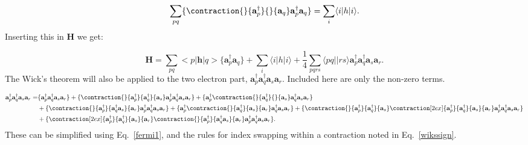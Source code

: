\documentclass[graybox,sectrefs,envcountresetchap,open=right]{svmonodo}
\begin{document}
\begin{equation}
\sum_{pq}
\{\contraction{}{\mathbf{a}^{\dagger}_p}{}{\mathbf{a}_q}
\mathbf{a}^{\dagger}_p \mathbf{a}_q \} = \sum_i \langle i|h|i \rangle .
\end{equation} 
Inserting this in $\mathbf{H}$ we get:

\begin{equation}
\mathbf{H} = \sum_{pq} <p|\mathbf{h}|q> 
\{\mathbf{a}^{\dagger}_p \mathbf{a}_q \}
+ \sum_i \langle i|h|i \rangle
 + 
\frac{1}{4} \sum_{pqrs} \langle pq||rs \rangle \mathbf{a}^{\dagger}_p \mathbf{a}^{\dagger}_q \mathbf{a}_s \mathbf{a}_r . \label{temp_h}
\end{equation} 
The Wick's theorem will also be applied to the two electron part, $\mathbf{a}^{\dagger}_p \mathbf{a}^{\dagger}_q \mathbf{a}_s \mathbf{a}_r$. Included here are only the non-zero terms.

\begin{align}
\mathbf{a}^{\dagger}_p \mathbf{a}^{\dagger}_q \mathbf{a}_s \mathbf{a}_r = & \{\mathbf{a}^{\dagger}_p \mathbf{a}^{\dagger}_q \mathbf{a}_s \mathbf{a}_r\} 
+ \{
\contraction{}{\mathbf{a}^{\dagger}_p}{\mathbf{a}^{\dagger}_q}{\mathbf{a}_s}
\mathbf{a}^{\dagger}_p \mathbf{a}^{\dagger}_q \mathbf{a}_s 
\mathbf{a}_r
\}
+ \{
\mathbf{a}^{\dagger}_p
\contraction{}{\mathbf{a}^{\dagger}_q}{}{\mathbf{a}_s}
\mathbf{a}^{\dagger}_q \mathbf{a}_s 
\mathbf{a}_r
\} \nonumber \\ &
+ \{
\contraction{}{\mathbf{a}^{\dagger}_p}{\mathbf{a}^{\dagger}_q \mathbf{a}_s}{\mathbf{a}_r}
\mathbf{a}^{\dagger}_p \mathbf{a}^{\dagger}_q \mathbf{a}_s 
\mathbf{a}_r
\}
+ \{\mathbf{a}^{\dagger}_p
\contraction{}{\mathbf{a}^{\dagger}_q}{\mathbf{a}_s}{\mathbf{a}_r}
\mathbf{a}^{\dagger}_q \mathbf{a}_s \mathbf{a}_r
\}
+ \{
\contraction{}{\mathbf{a}^{\dagger}_p}{\mathbf{a}^{\dagger}_q}{\mathbf{a}_s}
\contraction[2ex]{\mathbf{a}^{\dagger}_p}{\mathbf{a}^{\dagger}_q}{\mathbf{a}_s}{\mathbf{a}_r}
\mathbf{a}^{\dagger}_p \mathbf{a}^{\dagger}_q \mathbf{a}_s 
\mathbf{a}_r
\} \nonumber \\ &
+ \{
\contraction[2ex]{\mathbf{a}^{\dagger}_p}{\mathbf{a}^{\dagger}_q}{\mathbf{a}_s}{\mathbf{a}_r}
\contraction{}{\mathbf{a}^{\dagger}_p}{\mathbf{a}^{\dagger}_q \mathbf{a}_s}{\mathbf{a}_r}
\mathbf{a}^{\dagger}_p \mathbf{a}^{\dagger}_q \mathbf{a}_s 
\mathbf{a}_r
\} . \nonumber
\end{align} 
These can be simplified using Eq.~\ref{fermi1}, and the rules for index swapping within a contraction noted in Eq.~\ref{wikssign}.
\end{document}
